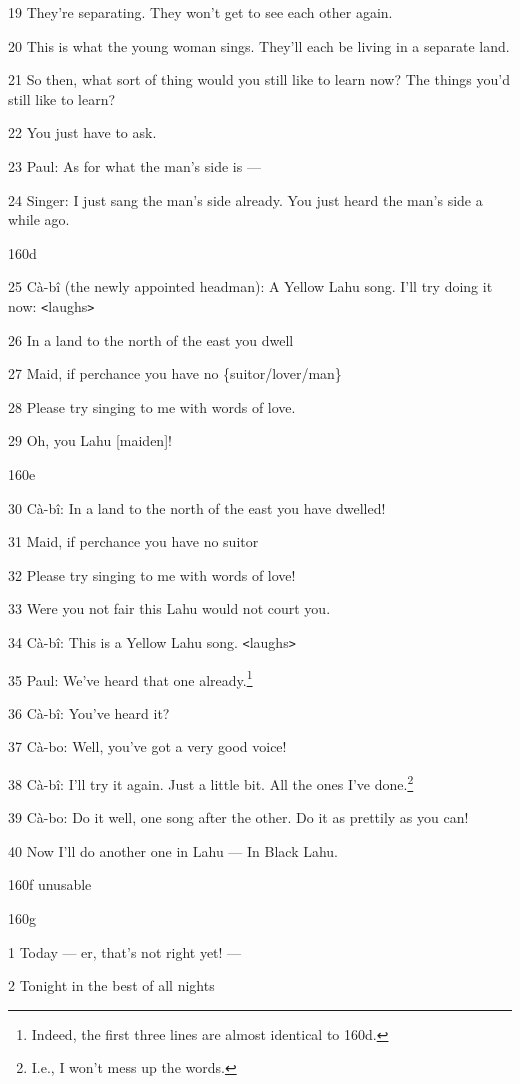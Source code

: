 19 They're separating. They won't get to see each other again.

20 This is what the young woman sings. They'll each be living in a separate land.

21 So then, what sort of thing would you still like to learn now? The things you'd
still like to learn?

22 You just have to ask.

23 Paul: As for what the man's side is ---

24 Singer: I just sang the man's side already. You just heard the man's side a
while ago.

160d

25 Cà-bî (the newly appointed headman): A Yellow Lahu song. I'll try doing it
now: \texttt{<}laughs\texttt{>}

26 In a land to the north of the east you dwell

27 Maid, if perchance you have no \{suitor/lover/man\}

28 Please try singing to me with words of love.

29 Oh, you Lahu [maiden]!

160e

30 Cà-bî: In a land to the north of the east you have dwelled!

31 Maid, if perchance you have no suitor

32 Please try singing to me with words of love!

33 Were you not fair this Lahu would not court you.

34 Cà-bî: This is a Yellow Lahu song. \texttt{<}laughs\texttt{>}

35 Paul: We've heard that one already.\footnote{Indeed, the first three lines are almost identical to 160d.}

36 Cà-bî: You've heard it?

37 Cà-bo: Well, you've got a very good voice!

38 Cà-bî: I'll try it again. Just a little bit. All the ones I've done.\footnote{I.e., I won't mess up the words.}

39 Cà-bo: Do it well, one song after the other. Do it as prettily as you can!

40 Now I'll do another one in Lahu --- In Black Lahu.

160f unusable

160g

1 Today --- er, that's not right yet! ---

2 Tonight in the best of all nights

